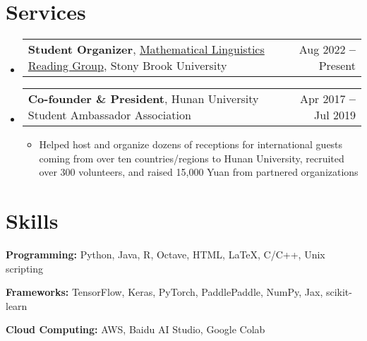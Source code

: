 \documentclass[letterpaper,11pt]{article}
\makeatletter
\newcommand{\resumeItem}[1]{
  \item\small{
    {#1 \vspace{-2pt}}
  }
}
\newcommand{\resumeProjectHeading}[2]{
    \vspace{-2pt}\item
    \begin{tabular*}{0.97\textwidth}{l@{\extracolsep{\fill}}r}
      \small#1 & #2 \\
    \end{tabular*}\vspace{-7pt}
}
\newcommand{\resumeSubHeadingListStart}{\begin{itemize}[leftmargin=0.15in, label={}]}
\newcommand{\resumeSubHeadingListEnd}{\end{itemize}}
\newcommand{\resumeItemListStart}{\begin{itemize}}
\newcommand{\resumeItemListEnd}{\end{itemize}\vspace{-5pt}}
\makeatother
\begin{document}

\section{Services}
    \resumeSubHeadingListStart
    \resumeProjectHeading
        {\textbf{Student Organizer}, \href{https://complab-stonybrook.github.io/mlrg/}{Mathematical Linguistics Reading Group}, Stony Brook University}{Aug 2022 \textbf{--} Present}

    \resumeProjectHeading        
    	 {\textbf{Co-founder \& President}, Hunan University Student Ambassador Association}{Apr 2017 \textbf{--} Jul 2019 }
          \resumeItemListStart
            \resumeItem{Helped host and organize dozens of receptions for international guests coming from over ten countries/regions to Hunan University, recruited over 300 volunteers, and raised 15,000 Yuan from partnered organizations}
          \resumeItemListEnd

    \resumeSubHeadingListEnd

\vspace{-20pt}


\section{Skills}
  \resumeSubHeadingListStart
    \small{\item{
        \textbf{Programming:}{ Python, Java, R, Octave, HTML, \LaTeX, C/C++, Unix scripting} \\ \vspace{2pt}
        
        \textbf{Frameworks:}{ TensorFlow, Keras, PyTorch, PaddlePaddle, NumPy, Jax, scikit-learn} \\ \vspace{2pt}
        
        \textbf{Cloud Computing:}{ AWS, Baidu AI Studio, Google Colab}
    }} \\ \vspace{-5pt}
  \resumeSubHeadingListEnd


\end{document}
